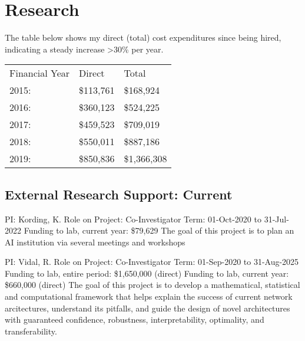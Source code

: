 \documentclass[10pt,colorlinks=true,urlcolor=blue]{moderncv}
\begin{document}
\section{Research}
The table below shows my direct (total) cost expenditures since being hired, indicating a steady increase >30\% per year.\newline \newline

\centering
\begin{tabular}{p{3cm}p{2cm}p{3cm}}
Financial Year & Direct & Total \\
2015: & \$113,761 & \$168,924 \\
2016: & \$360,123 & \$524,225 \\
2017: & \$459,523 & \$709,019 \\
2018: & \$550,011 & \$887,186 \\
2019: & \$850,836 & \$1,366,308
\end{tabular}

\subsection{External Research Support: Current}

{\newline PI: Kording, K.
\newline Role on Project: Co-Investigator
\newline Term: 01-Oct-2020 to 31-Jul-2022
\newline Funding to lab, current year: \$79,629
\newline The goal of this project is to plan an AI institution via several meetings and workshops}{}{}{}

{\newline PI: Vidal, R.
\newline Role on Project: Co-Investigator
\newline Term: 01-Sep-2020 to 31-Aug-2025
\newline Funding to lab, entire period: \$1,650,000 (direct)
\newline Funding to lab, current year: \$660,000 (direct)
\newline The goal of this project is to develop a mathematical, statistical and computational framework that helps explain the success of current network arcitectures, understand its pitfalls, and guide the
design of novel architectures with guaranteed confidence, robustness, interpretability, optimality, and transferability.}{}{}{}
\end{document}
